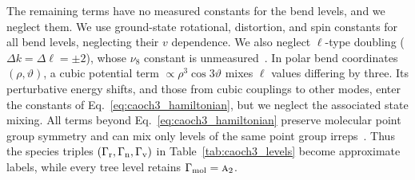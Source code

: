 The remaining terms have no measured constants for the bend levels, and we neglect them. We use ground-state rotational, distortion, and spin constants for all bend levels, neglecting their $v$ dependence. We also neglect $\ell$-type doubling ($\Delta k=\Delta\ell=\pm2$), whose $\nu_8$ constant is unmeasured~\cite{Nielsen1951}. In polar bend coordinates $(\rho,\vartheta)$, a cubic potential term $\propto\rho^3\cos3\vartheta$ mixes $\ell$ values differing by three. Its perturbative energy shifts, and those from cubic couplings to other modes, enter the constants of Eq.~\eqref{eq:caoch3_hamiltonian}, but we neglect the associated state mixing. All terms beyond Eq.~\eqref{eq:caoch3_hamiltonian} preserve molecular point group symmetry and can mix only levels of the same point group irreps~\cite{BunkerJensen2006}. Thus the species triples $(\Gamma_{\mathrm{r}},\Gamma_{\mathrm{n}},\Gamma_{\mathrm{v}})$ in Table~\ref{tab:caoch3_levels} become approximate labels, while every tree level retains $\Gamma_{\mathrm{mol}}=\text{\normalfont\scshape a}_{2}$.


